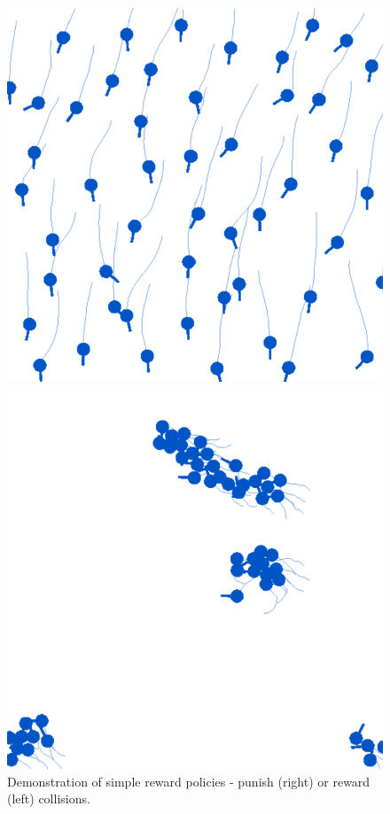 \documentclass[9pt]{IEEEtran}
\begin{document}
\begin{figure}[hbt]
    \centering
    \begin{minipage}{0.2\textwidth}
        \centering
        \includegraphics[width=\textwidth]{avoid.png}
    \end{minipage}
    \begin{minipage}{0.2\textwidth}
        \centering
        \includegraphics[width=\textwidth]{touch.png}
    \end{minipage}
    \caption{Demonstration of simple reward policies - punish (right) or reward (left) collisions.}
    \label{fig:demo}
\end{figure}
\end{document}
